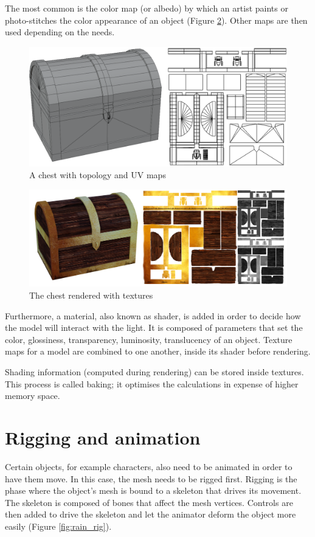 \documentclass[12pt,twoside]{report}
\begin{document}
The most common is the color map (or albedo) by which an artist paints or photo-stitches the color appearance of an object (Figure \ref{fig:chestTexture}). Other maps are then used depending on the needs.

\begin{figure}[hp]
    \centering
    \includegraphics[height=25ex]{graphics/chest_UV_topology.png}
    \caption{A chest with topology and UV maps}
    \label{fig:chestUVtop}
\end{figure}

\begin{figure}[hp]
    \centering
    \includegraphics[height=25ex]{graphics/chest.png}
    \caption{The chest rendered with textures}
    \label{fig:chestTexture}
\end{figure}

Furthermore, a material, also known as shader, is added in order to decide how the model will interact with the light. It is composed of parameters that set the color, glossiness, transparency, luminosity, translucency of an object. Texture maps for a model are combined to one another, inside its shader before rendering. 

Shading information (computed during rendering) can be stored inside textures. This process is called baking; it optimises the calculations in expense of higher memory space.

\section{Rigging and animation}
\label{sec:riggingAnim}
Certain objects, for example characters, also need to be animated in order to have them move. In this case, the mesh needs to be rigged first. Rigging is the phase where the object's mesh is bound to a skeleton that drives its movement. The skeleton is composed of bones that affect the mesh vertices. Controls are then added to drive the skeleton and let the animator deform the object more easily (Figure \ref{fig:rain_rig}).
\end{document}
